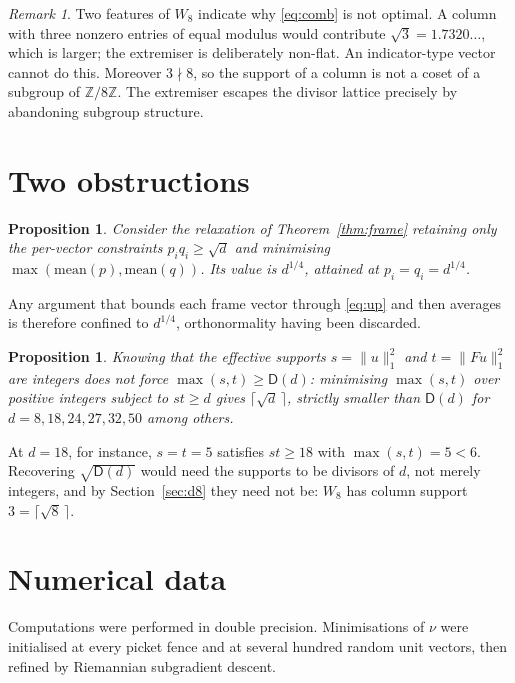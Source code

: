 \documentclass[11pt,reqno]{amsart}
\theoremstyle{plain}
\newtheorem{proposition}[theorem]{Proposition}
\theoremstyle{definition}
\theoremstyle{remark}
\newtheorem{remark}[theorem]{Remark}
\newcommand{\Z}{\mathbb{Z}}
\newcommand{\Dd}{\mathsf{D}}
\begin{document}
\begin{remark}\label{rem:d8structure}
Two features of $W_8$ indicate why \eqref{eq:comb} is not optimal.  A
column with three nonzero entries of equal modulus would contribute
$\sqrt3=1.7320\ldots$, which is larger; the extremiser is deliberately
non-flat.  An indicator-type vector cannot do this.  Moreover $3\nmid8$,
so the support of a column is not a coset of a subgroup of $\Z/8\Z$.
The extremiser escapes the divisor lattice precisely by abandoning
subgroup structure.
\end{remark}

\section{Two obstructions}\label{sec:obstruction}

\begin{proposition}\label{prop:obs1}
Consider the relaxation of Theorem~\ref{thm:frame} retaining only the
per-vector constraints $p_iq_i\ge\sqrt d$ and minimising
$\max(\mathrm{mean}(p),\mathrm{mean}(q))$.  Its value is $d^{1/4}$,
attained at $p_i=q_i=d^{1/4}$.
\end{proposition}

Any argument that bounds each frame vector through \eqref{eq:up} and
then averages is therefore confined to $d^{1/4}$, orthonormality having
been discarded.

\begin{proposition}\label{prop:obs2}
Knowing that the effective supports $s=\|u\|_1^2$ and $t=\|Fu\|_1^2$ are
integers does not force $\max(s,t)\ge\Dd(d)$: minimising $\max(s,t)$
over positive integers subject to $st\ge d$ gives
$\lceil\sqrt d\,\rceil$, strictly smaller than $\Dd(d)$ for
$d=8,18,24,27,32,50$ among others.
\end{proposition}

At $d=18$, for instance, $s=t=5$ satisfies $st\ge18$ with $\max(s,t)=5<6$.
Recovering $\sqrt{\Dd(d)}$ would need the supports to be divisors of
$d$, not merely integers, and by Section~\ref{sec:d8} they need not be:
$W_8$ has column support $3=\lceil\sqrt8\,\rceil$.

\section{Numerical data}\label{sec:num}

Computations were performed in double precision.  Minimisations of $\nu$
were initialised at every picket fence and at several hundred random
unit vectors, then refined by Riemannian subgradient descent.
\end{document}
